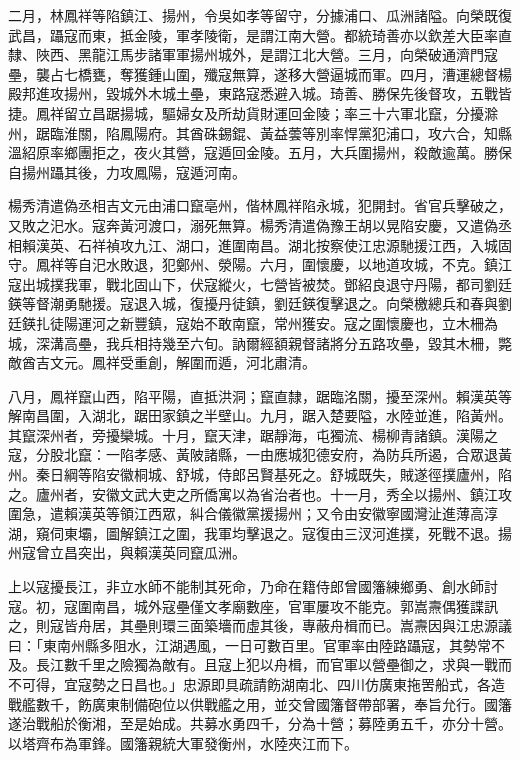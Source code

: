 \begin{pinyinscope}
二月，林鳳祥等陷鎮江、揚州，令吳如孝等留守，分據浦口、瓜洲諸隘。向榮既復武昌，躡寇而東，抵金陵，軍孝陵衛，是謂江南大營。都統琦善亦以欽差大臣率直隸、陜西、黑龍江馬步諸軍軍揚州城外，是謂江北大營。三月，向榮破通濟門寇壘，襲占七橋甕，奪獲鍾山圍，殲寇無算，遂移大營逼城而軍。四月，漕運總督楊殿邦進攻揚州，毀城外木城土壘，東路寇悉避入城。琦善、勝保先後督攻，五戰皆捷。鳳祥留立昌踞揚城，驅婦女及所劫貨財運回金陵；率三十六軍北竄，分擾滁州，踞臨淮關，陷鳳陽府。其酋硃錫錕、黃益蕓等別率悍黨犯浦口，攻六合，知縣溫紹原率鄉團拒之，夜火其營，寇遁回金陵。五月，大兵圍揚州，殺敵逾萬。勝保自揚州躡其後，力攻鳳陽，寇遁河南。

楊秀清遣偽丞相吉文元由浦口竄亳州，偕林鳳祥陷永城，犯開封。省官兵擊破之，又敗之汜水。寇奔黃河渡口，溺死無算。楊秀清遣偽豫王胡以晃陷安慶，又遣偽丞相賴漢英、石祥禎攻九江、湖口，進圍南昌。湖北按察使江忠源馳援江西，入城固守。鳳祥等自汜水敗退，犯鄭州、滎陽。六月，圍懷慶，以地道攻城，不克。鎮江寇出城撲我軍，戰北固山下，伏寇縱火，七營皆被焚。鄧紹良退守丹陽，都司劉廷鍈等督潮勇馳援。寇退入城，復擾丹徒鎮，劉廷鍈復擊退之。向榮檄總兵和春與劉廷鍈扎徒陽運河之新豐鎮，寇始不敢南竄，常州獲安。寇之圍懷慶也，立木柵為城，深溝高壘，我兵相持幾至六旬。訥爾經額親督諸將分五路攻壘，毀其木柵，斃敵酋吉文元。鳳祥受重創，解圍而遁，河北肅清。

八月，鳳祥竄山西，陷平陽，直抵洪洞；竄直隸，踞臨洺關，擾至深州。賴漢英等解南昌圍，入湖北，踞田家鎮之半壁山。九月，踞入楚要隘，水陸並進，陷黃州。其竄深州者，旁擾欒城。十月，竄天津，踞靜海，屯獨流、楊柳青諸鎮。漢陽之寇，分股北竄：一陷孝感、黃陂諸縣，一由應城犯德安府，為防兵所遏，合眾退黃州。秦日綱等陷安徽桐城、舒城，侍郎呂賢基死之。舒城既失，賊遂徑撲廬州，陷之。廬州者，安徽文武大吏之所僑寓以為省治者也。十一月，秀全以揚州、鎮江攻圍急，遣賴漢英等領江西眾，糾合儀徽黨援揚州；又令由安徽寧國灣沚進薄高淳湖，窺伺東壩，圖解鎮江之圍，我軍均擊退之。寇復由三汊河進撲，死戰不退。揚州寇曾立昌突出，與賴漢英同竄瓜洲。

上以寇擾長江，非立水師不能制其死命，乃命在籍侍郎曾國籓練鄉勇、創水師討寇。初，寇圍南昌，城外寇壘僅文孝廟數座，官軍屢攻不能克。郭嵩燾偶獲諜訊之，則寇皆舟居，其壘則環三面築墻而虛其後，專蔽舟楫而已。嵩燾因與江忠源議曰：「東南州縣多阻水，江湖遇風，一日可數百里。官軍率由陸路躡寇，其勢常不及。長江數千里之險獨為敵有。且寇上犯以舟楫，而官軍以營壘御之，求與一戰而不可得，宜寇勢之日昌也。」忠源即具疏請飭湖南北、四川仿廣東拖罟船式，各造戰艦數千，飭廣東制備砲位以供戰艦之用，並交曾國籓督帶部署，奉旨允行。國籓遂治戰船於衡湘，至是始成。共募水勇四千，分為十營；募陸勇五千，亦分十營。以塔齊布為軍鋒。國籓親統大軍發衡州，水陸夾江而下。


\end{pinyinscope}
